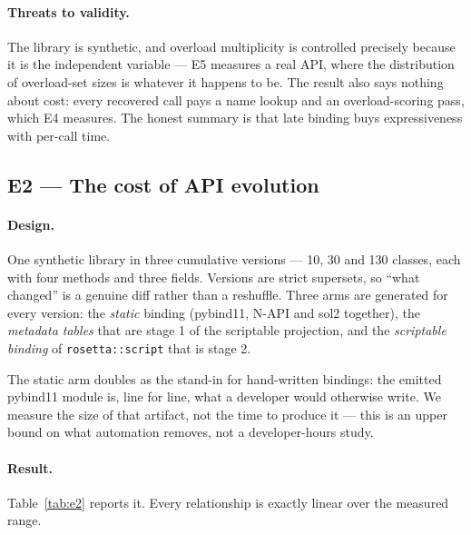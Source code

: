 \documentclass[11pt,a4paper]{article}
\newcommand{\code}[1]{\texttt{\small #1}}
\begin{document}
\paragraph{Threats to validity.} The library is synthetic, and overload
multiplicity is controlled precisely because it is the independent variable ---
E5 measures a real API, where the distribution of overload-set sizes is whatever
it happens to be. The result also says nothing about cost: every recovered call
pays a name lookup and an overload-scoring pass, which E4 measures. The honest
summary is that late binding buys expressiveness with per-call time.

\subsection{E2 --- The cost of API evolution}
\label{sec:e2}

\paragraph{Design.} One synthetic library in three cumulative versions --- 10,
30 and 130 classes, each with four methods and three fields. Versions are strict
supersets, so ``what changed'' is a genuine diff rather than a reshuffle. Three
arms are generated for every version: the \emph{static} binding (pybind11,
N-API and sol2 together), the \emph{metadata tables} that are stage 1 of the
scriptable projection, and the \emph{scriptable binding} of
\code{rosetta::script} that is stage 2.

The static arm doubles as the stand-in for hand-written bindings: the emitted
pybind11 module is, line for line, what a developer would otherwise write. We
measure the size of that artifact, not the time to produce it --- this is an
upper bound on what automation removes, not a developer-hours study.

\paragraph{Result.} Table~\ref{tab:e2} reports it. Every relationship is exactly
linear over the measured range.
\end{document}
